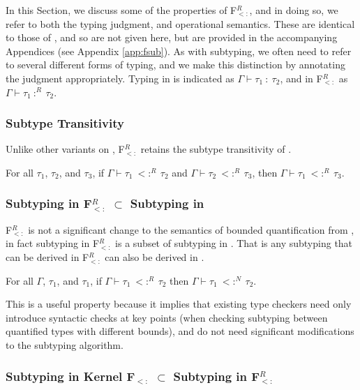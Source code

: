 \documentclass[runningheads, anon]{llncs}
\begin{document}
In this Section, we discuss some of the properties of F$_{<:}^R$, and in doing so, we refer to both the
typing judgment, and operational semantics. These are identical to those of \Fsub, and so are not 
given here, but are provided in the accompanying Appendices (see Appendix \ref{app:fsub}). As with 
subtyping, we often need to refer to several different forms of typing, and we make this distinction
by annotating the judgment appropriately. Typing in \Fsub is indicated as $\Gamma \vdash \tau_1\ :\ \tau_2$, 
and in F$_{<:}^R$ as $\Gamma \vdash \tau_1\ :^R\ \tau_2$.

\subsubsection{Subtype Transitivity}

Unlike other variants on \Fsub \cite{10.1145/3371077}, F$_{<:}^R$ retains the subtype transitivity of
\Fsub.

\begin{theorem}
For all $\tau_1$, $\tau_2$, and $\tau_3$, if $\Gamma \vdash \tau_1\ <:^R\ \tau_2$ and $\Gamma \vdash \tau_2\ <:^R\ \tau_3$, then
$\Gamma \vdash \tau_1\ <:^R\ \tau_3$.
\end{theorem}

\subsubsection{Subtyping in F$_{<:}^R$ $\subset$ Subtyping in \Fsub}

F$_{<:}^R$ is not a significant change to the semantics of bounded quantification 
from \Fsub, in fact subtyping in F$_{<:}^R$ is a subset of subtyping in \Fsub. That 
is any subtyping that can be derived in F$_{<:}^R$ can also be derived in \Fsub.

\begin{theorem}
For all $\Gamma$, $\tau_1$, and $\tau_1$, if $\Gamma \vdash \tau_1\ <:^R\ \tau_2$ then 
$\Gamma \vdash \tau_1\ <:^N\ \tau_2$.
\end{theorem}

This is a useful property because it implies that existing type checkers need only 
introduce syntactic checks at key points (when checking subtyping between quantified types with different bounds), 
and do not need significant modifications
to the subtyping algorithm.

\subsubsection{Subtyping in Kernel F$_{<:}$ $\subset$ Subtyping in F$_{<:}^R$}
\end{document}
